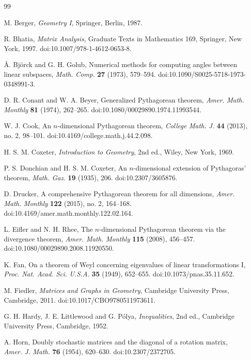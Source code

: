 \documentclass[11pt]{article}
\theoremstyle{definition}
\theoremstyle{remark}
\begin{document}
\begin{thebibliography}{99}

M. Berger,
\textit{Geometry I},
Springer, Berlin, 1987.

R. Bhatia,
\textit{Matrix Analysis},
Graduate Texts in Mathematics 169, Springer, New York, 1997.
doi:10.1007/978-1-4612-0653-8.

{\AA}. Bj\"orck and G. H. Golub,
Numerical methods for computing angles between linear subspaces,
\textit{Math. Comp.} \textbf{27} (1973), 579--594.
doi:10.1090/S0025-5718-1973-0348991-3.

D. R. Conant and W. A. Beyer,
Generalized Pythagorean theorem,
\textit{Amer. Math. Monthly} \textbf{81} (1974), 262--265.
doi:10.1080/00029890.1974.11993544.

W. J. Cook,
An $n$-dimensional Pythagorean theorem,
\textit{College Math. J.} \textbf{44} (2013), no. 2, 98--101.
doi:10.4169/college.math.j.44.2.098.

H. S. M. Coxeter,
\textit{Introduction to Geometry},
2nd ed., Wiley, New York, 1969.

P. S. Donchian and H. S. M. Coxeter,
An $n$-dimensional extension of Pythagoras' theorem,
\textit{Math. Gaz.} \textbf{19} (1935), 206.
doi:10.2307/3605876.

D. Drucker,
A comprehensive Pythagorean theorem for all dimensions,
\textit{Amer. Math. Monthly} \textbf{122} (2015), no. 2, 164--168.
doi:10.4169/amer.math.monthly.122.02.164.

L. Eifler and N. H. Rhee,
The $n$-dimensional Pythagorean theorem via the divergence theorem,
\textit{Amer. Math. Monthly} \textbf{115} (2008), 456--457.
doi:10.1080/00029890.2008.11920550.

K. Fan,
On a theorem of Weyl concerning eigenvalues of linear transformations I,
\textit{Proc. Nat. Acad. Sci. U.S.A.} \textbf{35} (1949), 652--655.
doi:10.1073/pnas.35.11.652.

M. Fiedler,
\textit{Matrices and Graphs in Geometry},
Cambridge University Press, Cambridge, 2011.
doi:10.1017/CBO9780511973611.

G. H. Hardy, J. E. Littlewood and G. P\'olya,
\textit{Inequalities},
2nd ed., Cambridge University Press, Cambridge, 1952.

A. Horn,
Doubly stochastic matrices and the diagonal of a rotation matrix,
\textit{Amer. J. Math.} \textbf{76} (1954), 620--630.
doi:10.2307/2372705.


\end{thebibliography}
\end{document}
